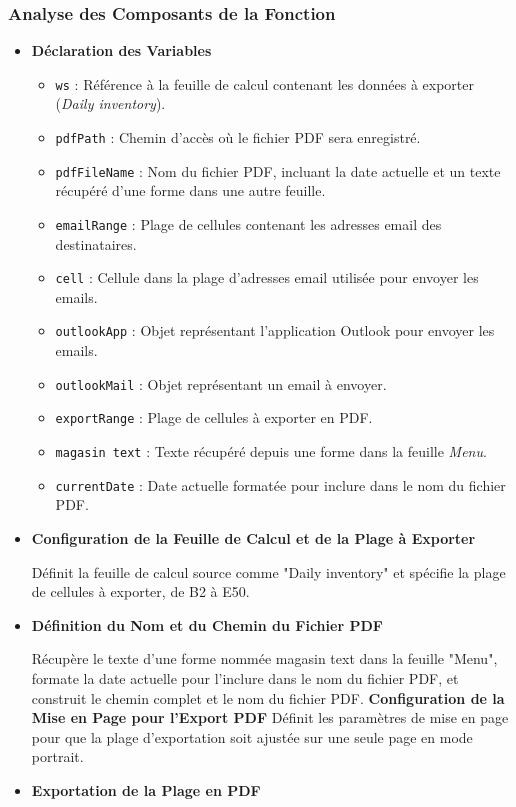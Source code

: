\documentclass[a4paper, oneside, 12pt, final]{extreport}
\begin{document}
\subsubsection{Analyse des Composants de la Fonction}
\begin{itemize}

\item\textbf{Déclaration des Variables}

\begin{itemize}
    \item \texttt{ws} : Référence à la feuille de calcul contenant les données à exporter (\textit{Daily inventory}).
    \item \texttt{pdfPath} : Chemin d'accès où le fichier PDF sera enregistré.
    \item \texttt{pdfFileName} : Nom du fichier PDF, incluant la date actuelle et un texte récupéré d'une forme dans une autre feuille.
    \item \texttt{emailRange} : Plage de cellules contenant les adresses email des destinataires.
    \item \texttt{cell} : Cellule dans la plage d'adresses email utilisée pour envoyer les emails.
    \item \texttt{outlookApp} : Objet représentant l'application Outlook pour envoyer les emails.
    \item \texttt{outlookMail} : Objet représentant un email à envoyer.
    \item \texttt{exportRange} : Plage de cellules à exporter en PDF.
    \item \texttt{magasin text} : Texte récupéré depuis une forme dans la feuille \textit{Menu}.
    \item \texttt{currentDate} : Date actuelle formatée pour inclure dans le nom du fichier PDF.
\end{itemize}

\item\textbf{Configuration de la Feuille de Calcul et de la Plage à Exporter}

Définit la feuille de calcul source comme "Daily inventory" et spécifie la plage de cellules à exporter, de B2 à E50.

\item\textbf{Définition du Nom et du Chemin du Fichier PDF}

Récupère le texte d'une forme nommée magasin text dans la feuille "Menu", formate la date actuelle pour l'inclure dans le nom du fichier PDF, et construit le chemin complet et le nom du fichier PDF.
\textbf{Configuration de la Mise en Page pour l'Export PDF}
Définit les paramètres de mise en page pour que la plage d'exportation soit ajustée sur une seule page en mode portrait.
\item\textbf{Exportation de la Plage en PDF}


\end{itemize}
\end{document}
